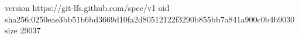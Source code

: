 version https://git-lfs.github.com/spec/v1
oid sha256:0250eae3bb51b6bd3669d10fa2d80512122f3290b855bb7a841a900c0b4b9030
size 29037
